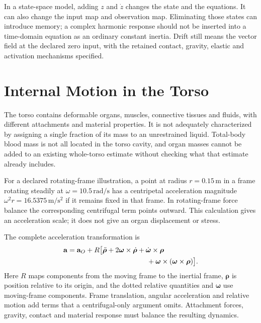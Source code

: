 In a state-space model, adding $z$ and $\dot z$ changes the state and the equations. It can also change the input map and observation map. Eliminating those states can introduce memory; a complex harmonic response should not be inserted into a time-domain equation as an ordinary constant inertia. Drift still means the vector field at the declared zero input, with the retained contact, gravity, elastic and activation mechanisms specified.

\section{Internal Motion in the Torso}
\label{sec:fluid_torso}

The torso contains deformable organs, muscles, connective tissues and fluids, with different attachments and material properties. It is not adequately characterized by assigning a single fraction of its mass to an unrestrained liquid. Total-body blood mass is not all located in the torso cavity, and organ masses cannot be added to an existing whole-torso estimate without checking what that estimate already includes.

For a declared rotating-frame illustration, a point at radius $r=0.15\,\mathrm{m}$ in a frame rotating steadily at $\omega=10.5\,\mathrm{rad/s}$ has a centripetal acceleration magnitude $\omega^2r=16.5375\,\mathrm{m/s^2}$ if it remains fixed in that frame. In rotating-frame force balance the corresponding centrifugal term points outward. This calculation gives an acceleration scale; it does not give an organ displacement or stress.

The complete acceleration transformation is
\[
\begin{aligned}
\mathbf a={}&\mathbf a_O+R\bigl[
\ddot{\boldsymbol\rho}
+2\boldsymbol\omega\times\dot{\boldsymbol\rho}
+\dot{\boldsymbol\omega}\times\boldsymbol\rho\\
&\hspace{35mm}
+\boldsymbol\omega\times(\boldsymbol\omega\times\boldsymbol\rho)
\bigr].
\end{aligned}
\]
Here $R$ maps components from the moving frame to the inertial frame, $\boldsymbol\rho$ is position relative to its origin, and the dotted relative quantities and $\boldsymbol\omega$ use moving-frame components. Frame translation, angular acceleration and relative motion add terms that a centrifugal-only argument omits. Attachment forces, gravity, contact and material response must balance the resulting dynamics.

